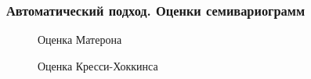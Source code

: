 \documentclass[10pt,pdf,aspectratio=169,hyperref={unicode}]{beamer}
\begin{document}
\begin{frame}\frametitle{Автоматический подход. \small{Оценки семивариограмм}}
  \begin{figure}[h]
  \begin{minipage}[h]{0.49\linewidth}
    \caption{Оценка Матерона}
  \end{minipage}
  \hfill
  \begin{minipage}[h]{0.49\linewidth}
    \caption{Оценка Кресси-Хоккинса}
  \end{minipage}
\end{figure}
\end{frame}
\end{document}

